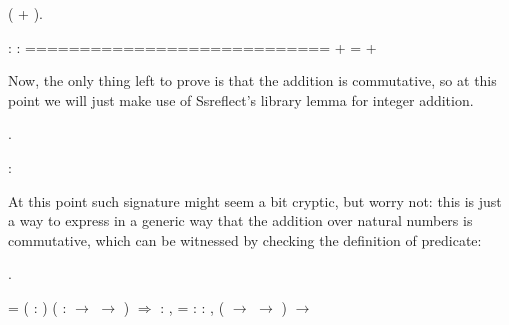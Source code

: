 \begin{coqdoccode}
\coqdocemptyline
\coqdocnoindent
{} (\coqdocvar{\_} + \coqdocvar{\_}).\coqdoceol
\coqdocemptyline
\end{coqdoccode}


\coqdoceol
\coqdocemptyline
\coqdocindent{1.00em}
 : \coqdoceol
\coqdocindent{1.00em}
 : \coqdoceol
\coqdocindent{1.00em}
============================\coqdoceol
\coqdocindent{1.50em}
 +  =  + 

\coqdocemptyline


Now, the only thing left to prove is that the addition is commutative,
so at this point we will just make use of Ssreflect's  library
lemma for integer addition.


\begin{coqdoccode}
\coqdocemptyline
\coqdocnoindent
{} .\coqdoceol
\coqdocemptyline
\end{coqdoccode}
\coqdoceol
\coqdocemptyline
\coqdocnoindent
{}\coqdoceol
\coqdocindent{2.50em}
:  

\coqdocemptyline


At this point such signature might seem a bit cryptic, but worry not:
this is just a way to express in a generic way that the addition over
natural numbers is commutative, which can be witnessed by checking the
definition of  predicate:


\begin{coqdoccode}
\coqdocemptyline
\coqdocnoindent
{} .\coqdoceol
\coqdocemptyline
\end{coqdoccode}


\coqdoceol
\coqdocemptyline
\coqdocnoindent
{} = \coqdoceol
\coqdocindent{1.00em}
 (  : ) ( :  \ensuremath{\rightarrow}  \ensuremath{\rightarrow} ) \ensuremath{\Rightarrow} \coqdockw{\ensuremath{\forall}}   : ,    =   \coqdoceol
\coqdocindent{3.50em}
: \coqdockw{\ensuremath{\forall}}   : , ( \ensuremath{\rightarrow}  \ensuremath{\rightarrow} ) \ensuremath{\rightarrow} 

